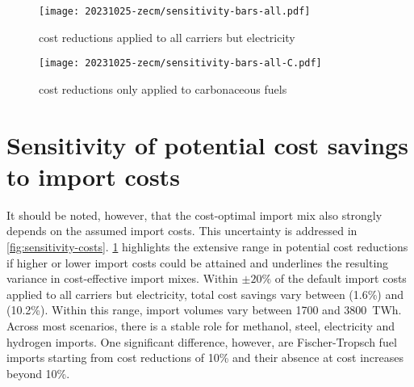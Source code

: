 \begin{figure*}
    \begin{subfigure}[t]{\columnwidth}
        \caption{cost reductions applied to all carriers but electricity}
        \label{fig:sensitivity-costs:A}
        \texttt{[image: 20231025-zecm/sensitivity-bars-all.pdf]}
    \end{subfigure}
    \begin{subfigure}[t]{\columnwidth}
        \caption{cost reductions only applied to carbonaceous fuels}
        \label{fig:sensitivity-costs:B}
        \texttt{[image: 20231025-zecm/sensitivity-bars-all-C.pdf]}
    \end{subfigure}
    \caption{\textbf{Effect of import cost variations on cost savings and import shares with all vectors allowed.}
    In panel (a), indicated relative cost changes are applied uniformly to all
    vectors but electricity imports. In panel (b), cost changes are only applied
    to carbonaceous fuels (methane, methanol and Fischer-Tropsch). Top subpanels
    show potential cost savings compared to the scenario without imports. Bottom
    subpanels show the share and composition of different import vectors in
    relation to total energy system costs. The information is shown both in
    absolute terms and relative terms compared to the scenario without imports.
    }
    \label{fig:sensitivity-costs}
\end{figure*}

\section*{Sensitivity of potential cost savings to import costs}

It should be noted, however, that the cost-optimal import mix also strongly
depends on the assumed import costs. This uncertainty is addressed in
\cref{fig:sensitivity-costs}. \cref{fig:sensitivity-costs:A} highlights the
extensive range in potential cost reductions if higher or lower import costs
could be attained and underlines the resulting variance in cost-effective import
mixes. Within $\pm 20\%$ of the default import costs applied to all carriers but
electricity, total cost savings vary between  (1.6\%) and 
(10.2\%). Within this range, import volumes vary between 1700 and 3800~TWh.
Across most scenarios, there is a stable role for methanol, steel, electricity
and hydrogen imports. One significant difference, however, are Fischer-Tropsch
fuel imports starting from cost reductions of 10\% and their absence at cost
increases beyond 10\%.

